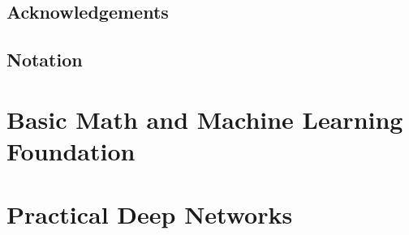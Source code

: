 \documentclass[10pt,\papersize,twoside,openright]{book}
\theoremstyle{definition}
\theoremstyle{remark}
\begin{document}
\vspace*{\fill}
\clearpage

\setcounter{page}{1}
\frontmatter

\tableofcontents

\chapter*{Acknowledgements}


\chapter*{Notation}


\mainmatter



\part{Basic Math and Machine Learning Foundation}









\part{Practical Deep Networks}




\end{document}
